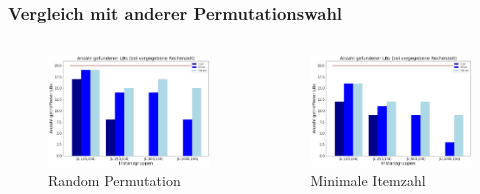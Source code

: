 \documentclass{beamer}
\begin{document}
\begin{frame}
\frametitle{Vergleich mit anderer Permutationswahl}


\begin{columns}[c] %

\begin{figure}[!htbp]
\includegraphics[scale=0.2]{img/lb_unif.png}
\caption{Random Permutation}
\label{fig:architecture}
\end{figure}


\begin{figure}[!htbp]
\includegraphics[scale=0.2]{img/lb_unif_heuristic.png}
\caption{Minimale Itemzahl}
\label{fig:architecture}
\end{figure}


\end{columns}
\end{frame}
\end{document}
